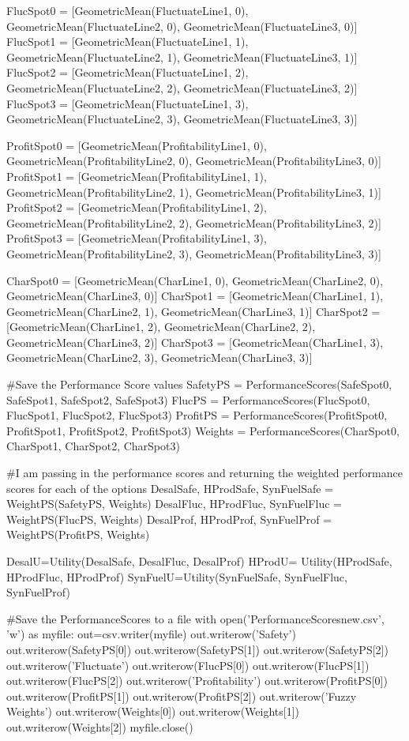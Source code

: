 \documentclass[12pt]{UIdahoMastersThesis}
\begin{document}
FlucSpot0 =  [GeometricMean(FluctuateLine1, 0), GeometricMean(FluctuateLine2, 0), GeometricMean(FluctuateLine3, 0)]
FlucSpot1  = [GeometricMean(FluctuateLine1, 1), GeometricMean(FluctuateLine2, 1), GeometricMean(FluctuateLine3, 1)]
FlucSpot2  = [GeometricMean(FluctuateLine1, 2), GeometricMean(FluctuateLine2, 2), GeometricMean(FluctuateLine3, 2)]
FlucSpot3  = [GeometricMean(FluctuateLine1, 3), GeometricMean(FluctuateLine2, 3), GeometricMean(FluctuateLine3, 3)]

ProfitSpot0 =  [GeometricMean(ProfitabilityLine1, 0), GeometricMean(ProfitabilityLine2, 0), GeometricMean(ProfitabilityLine3, 0)]
ProfitSpot1  = [GeometricMean(ProfitabilityLine1, 1), GeometricMean(ProfitabilityLine2, 1), GeometricMean(ProfitabilityLine3, 1)]
ProfitSpot2  = [GeometricMean(ProfitabilityLine1, 2), GeometricMean(ProfitabilityLine2, 2), GeometricMean(ProfitabilityLine3, 2)]
ProfitSpot3  = [GeometricMean(ProfitabilityLine1, 3), GeometricMean(ProfitabilityLine2, 3), GeometricMean(ProfitabilityLine3, 3)]

CharSpot0 =  [GeometricMean(CharLine1, 0), GeometricMean(CharLine2, 0), GeometricMean(CharLine3, 0)]
CharSpot1  = [GeometricMean(CharLine1, 1), GeometricMean(CharLine2, 1), GeometricMean(CharLine3, 1)]
CharSpot2  = [GeometricMean(CharLine1, 2), GeometricMean(CharLine2, 2), GeometricMean(CharLine3, 2)]
CharSpot3  = [GeometricMean(CharLine1, 3), GeometricMean(CharLine2, 3), GeometricMean(CharLine3, 3)]

\#Save the Performance Score values
SafetyPS = PerformanceScores(SafeSpot0, SafeSpot1, SafeSpot2, SafeSpot3)
FlucPS = PerformanceScores(FlucSpot0, FlucSpot1, FlucSpot2, FlucSpot3)
ProfitPS = PerformanceScores(ProfitSpot0, ProfitSpot1, ProfitSpot2, ProfitSpot3)
Weights = PerformanceScores(CharSpot0, CharSpot1, CharSpot2, CharSpot3)



\#I am passing in the performance scores and returning the weighted performance scores for each of the options
DesalSafe, HProdSafe, SynFuelSafe = WeightPS(SafetyPS, Weights)
DesalFluc, HProdFluc, SynFuelFluc = WeightPS(FlucPS, Weights)
DesalProf, HProdProf, SynFuelProf = WeightPS(ProfitPS, Weights)

DesalU=Utility(DesalSafe, DesalFluc, DesalProf)
HProdU= Utility(HProdSafe, HProdFluc, HProdProf)
SynFuelU=Utility(SynFuelSafe, SynFuelFluc, SynFuelProf)

\#Save the PerformanceScores to a file
with open('PerformanceScoresnew.csv', 'w') as myfile:
    out=csv.writer(myfile)
    out.writerow('Safety')
    out.writerow(SafetyPS[0])
    out.writerow(SafetyPS[1])
    out.writerow(SafetyPS[2])
    out.writerow('Fluctuate')
    out.writerow(FlucPS[0])
    out.writerow(FlucPS[1])
    out.writerow(FlucPS[2])
    out.writerow('Profitability')
    out.writerow(ProfitPS[0])
    out.writerow(ProfitPS[1])
    out.writerow(ProfitPS[2])
    out.writerow('Fuzzy Weights')
    out.writerow(Weights[0])
    out.writerow(Weights[1])
    out.writerow(Weights[2])
myfile.close()
\end{document}
